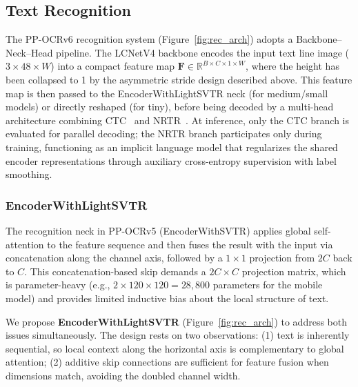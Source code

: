 \documentclass[11pt, a4paper,logo,  copyright, nonumbering]{paddleocr}
\begin{document}
\subsection{Text Recognition}
\label{sec:recognition}

The PP-OCRv6 recognition system (Figure~\ref{fig:rec_arch}) adopts a Backbone--Neck--Head pipeline. The LCNetV4 backbone encodes the input text line image ($3 \times 48 \times W$) into a compact feature map $\mathbf{F} \in \mathbb{R}^{B \times C \times 1 \times W}$, where the height has been collapsed to 1 by the asymmetric stride design described above. This feature map is then passed to the EncoderWithLightSVTR neck (for medium/small models) or directly reshaped (for tiny), before being decoded by a multi-head architecture combining CTC~\cite{hu2020gtc} and NRTR~\cite{sheng2019nrtr}. At inference, only the CTC branch is evaluated for parallel decoding; the NRTR branch participates only during training, functioning as an implicit language model that regularizes the shared encoder representations through auxiliary cross-entropy supervision with label smoothing.

\subsubsection{EncoderWithLightSVTR}

The recognition neck in PP-OCRv5 (EncoderWithSVTR) applies global self-attention to the feature sequence and then fuses the result with the input via concatenation along the channel axis, followed by a $1\times1$ projection from $2C$ back to $C$. This concatenation-based skip demands a $2C \times C$ projection matrix, which is parameter-heavy (e.g., $2 \times 120 \times 120 = 28{,}800$ parameters for the mobile model) and provides limited inductive bias about the local structure of text.

We propose \textbf{EncoderWithLightSVTR} (Figure~\ref{fig:rec_arch}) to address both issues simultaneously. The design rests on two observations: (1) text is inherently sequential, so local context along the horizontal axis is complementary to global attention; (2) additive skip connections are sufficient for feature fusion when dimensions match, avoiding the doubled channel width.
\end{document}
